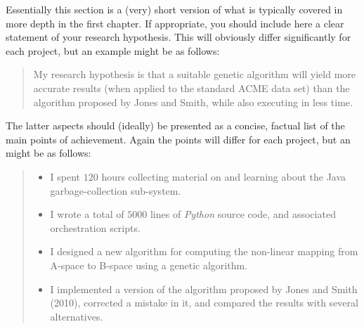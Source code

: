 \documentclass{dissertation}
\begin{document}
Essentially 
this section is a (very) short version of what is typically covered in more depth in the first 
chapter.  If appropriate, you should include here  
a clear statement of your research hypothesis.  This will obviously differ significantly
for each project, but an example might be as follows:

\begin{quote}
My research hypothesis is that a suitable genetic algorithm will yield
more accurate results (when applied to the standard ACME data set) than 
the algorithm proposed by Jones and Smith, while also executing in less
time.
\end{quote}

\noindent
The latter aspects should (ideally) be presented as a concise, factual 
list of the main points of achievement.  Again the points will differ for each project, but 
an might be as follows:

\begin{quote}
\noindent
\begin{itemize}
\item I spent $120$ hours collecting material on and learning about the 
      Java garbage-collection sub-system. 
\item I wrote a total of $5000$ lines of {\em Python} source code, and associated orchestration scripts. 
\item I designed a new algorithm for computing the non-linear mapping 
      from A-space to B-space using a genetic algorithm.
\item I implemented a version of the algorithm proposed by Jones and 
      Smith (2010), corrected a mistake in it, and 
      compared the results with several alternatives.
\end{itemize}
\end{quote}

\end{document}
